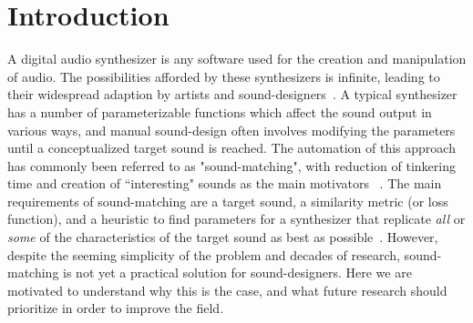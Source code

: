 \section{Introduction}


A digital audio synthesizer is any software used for the creation and manipulation of audio. The possibilities afforded by these synthesizers is infinite, leading to their widespread adaption by artists and sound-designers~\cite{lyons1997understanding,russ1999sound,stranneby2004digital}. A typical synthesizer has a number of parameterizable functions which affect the sound output in various ways, and manual sound-design often involves modifying the parameters until a conceptualized target sound is reached. The automation of this approach has commonly been referred to as "sound-matching", with reduction of tinkering time and creation of ``interesting" sounds as the main motivators ~\cite{krekovic2019insights,turian2020sorry,horner1993machine,salimi2020make,esling2019flow,engel2020ddsp,mitchell2007evolutionary,shier2020spiegelib,masuda2021soundmatch,masuda2023improving}. The main requirements of sound-matching are a target sound, a similarity metric (or loss function), and a heuristic to find parameters for a synthesizer that replicate \textit{all} or \textit{some} of the characteristics of the target sound as best as possible~\cite{horner1993machine,mitchell2007evolutionary,masuda2023improving}. However, despite the seeming simplicity of the problem and decades of research, sound-matching is not yet a practical solution for sound-designers. Here we are motivated to understand why this is the case, and what future research should prioritize in order to improve the field. 

